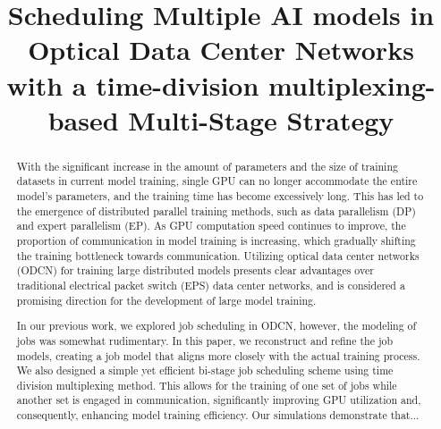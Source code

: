 \documentclass[conference]{IEEEtran}
\begin{document}
\title{Scheduling Multiple AI models in Optical Data Center Networks with a time-division multiplexing-based Multi-Stage Strategy\\
}

\author{
	}

\maketitle

\begin{abstract}
With the significant increase in the amount of parameters and the size of training datasets in current model training, single GPU can no longer accommodate the entire model's parameters, and the training time has become excessively long. This has led to the emergence of distributed parallel training methods, such as data parallelism (DP) and expert parallelism (EP). As GPU computation speed continues to improve, the proportion of communication in model training is increasing, which gradually shifting the training bottleneck towards communication. Utilizing optical data center networks (ODCN) for training large distributed models presents clear advantages over traditional electrical packet switch (EPS) data center networks, and is considered a promising direction for the development of large model training.

In our previous work, we explored job scheduling in ODCN, however, the modeling of jobs was somewhat rudimentary. In this paper, we reconstruct and refine the job models, creating a job model that aligns more closely with the actual training process. We also designed a simple yet efficient bi-stage job scheduling scheme using time division multiplexing method. This allows for the training of one set of jobs while another set is engaged in communication, significantly improving GPU utilization and, consequently, enhancing model training efficiency. Our simulations demonstrate that...
\end{abstract}
\end{document}
